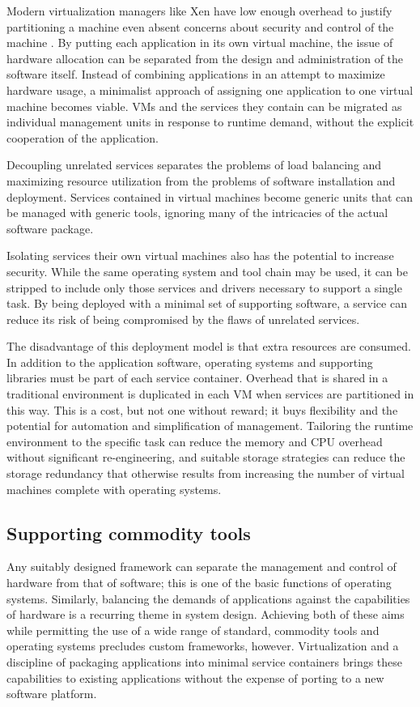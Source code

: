 Modern virtualization managers like Xen have low enough overhead to justify partitioning a machine even absent concerns about security and control of the machine \cite{barham}. By putting each application in its own virtual machine, the issue of hardware allocation can be separated from the design and administration of the software itself. Instead of combining applications in an attempt to maximize hardware usage, a minimalist approach of assigning one application to one virtual machine becomes viable. VMs and the services they contain can be migrated as individual management units in response to runtime demand, without the explicit cooperation of the application.

Decoupling unrelated services separates the problems of load balancing and maximizing resource utilization from the problems of software installation and deployment. Services contained in virtual machines become generic units that can be managed with generic tools, ignoring many of the intricacies of the actual software package.

Isolating services their own virtual machines also has the potential to increase security. While the same operating system and tool chain may be used, it can be stripped to include only those services and drivers necessary to support a single task. By being deployed with a minimal set of supporting software, a service can reduce its risk of being compromised by the flaws of unrelated services.

The disadvantage of this deployment model is that extra resources are consumed. In addition to the application software, operating systems and supporting libraries must be part of each service container. Overhead that is shared in a traditional environment is duplicated in each VM when services are partitioned in this way. This is a cost, but not one without reward; it buys flexibility and the potential for automation and simplification of management. Tailoring the runtime environment to the specific task can reduce the memory and CPU overhead without significant re-engineering, and suitable storage strategies can reduce the storage redundancy that otherwise results from increasing the number of virtual machines complete with operating systems.

\subsection{Supporting commodity tools}

Any suitably designed framework can separate the management and control of hardware from that of software; this is one of the basic functions of operating systems. Similarly, balancing the demands of applications against the capabilities of hardware is a recurring theme in system design. Achieving both of these aims while permitting the use of a wide range of standard, commodity tools and operating systems precludes custom frameworks, however. Virtualization and a discipline of packaging applications into minimal service containers brings these capabilities to existing applications without the expense of porting to a new software platform.


